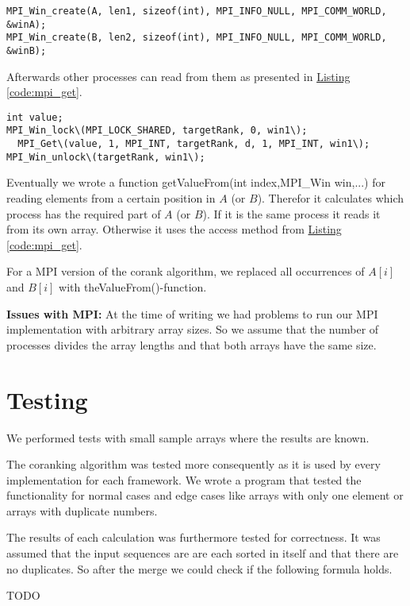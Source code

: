 \begin{lstlisting}[caption=window to share arrays, label=code:mpi_window,style=c]
MPI_Win_create(A, len1, sizeof(int), MPI_INFO_NULL, MPI_COMM_WORLD, &winA);
MPI_Win_create(B, len2, sizeof(int), MPI_INFO_NULL, MPI_COMM_WORLD, &winB);
\end{lstlisting}

Afterwards other processes can read from them as presented in \hyperref[code:mpi_get]{Listing \ref*{code:mpi_get}}.

\begin{lstlisting}[caption=window to share arrays, label=code:mpi_get,style=c]
int value;
MPI_Win_lock\(MPI_LOCK_SHARED, targetRank, 0, win1\);
  MPI_Get\(value, 1, MPI_INT, targetRank, d, 1, MPI_INT, win1\);
MPI_Win_unlock\(targetRank, win1\);
\end{lstlisting}

Eventually we wrote a function getValueFrom(int index,MPI\_Win win,...) for reading elements from a certain position in $A$ (or $B$).
Therefor it calculates which process has the required part of $A$ (or $B$).
If it is the same process it reads it from its own array.
Otherwise it uses the access method from \hyperref[code:mpi_get]{Listing \ref*{code:mpi_get}}.

For a MPI version of the corank algorithm, we replaced all occurrences of $A[i]$ and $B[i]$ with theValueFrom()-function.


\textbf{Issues with MPI:}
At the time of writing we had problems to run our MPI implementation with arbitrary array sizes.
So we assume that the number of processes divides the array lengths and that both arrays have the same size.

\section{Testing}
We performed tests with small sample arrays where the results are known.

The coranking algorithm was tested more consequently as it is used by every implementation for each framework. We wrote a program that tested the functionality for normal cases and edge cases like arrays with only one element or arrays with duplicate numbers.

The results of each calculation was furthermore tested for correctness. It was assumed that the input sequences are are each sorted in itself and that there are no duplicates. So after the merge we could check if the following formula holds.

TODO

